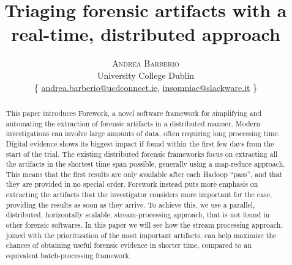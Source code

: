 \documentclass[twoside]{article}
\title{\vspace{-15mm}\fontsize{24pt}{10pt}\selectfont\textbf{Triaging forensic
    artifacts with a real-time, distributed approach}}
\author{\large
\textsc{Andrea Barberio}\\[2mm] %
\normalsize University College Dublin \\ %
\normalsize
    \{
        \href{mailto:andrea.barberio@ucdconnect.ie}{andrea.barberio@ucdconnect.ie},
        \href{mailto:insomniac@slackware.it}{insomniac@slackware.it}
    \}
\vspace{-5mm}
}
\date{}
\begin{document}
\maketitle %

\thispagestyle{fancy} %


\begin{abstract}

\noindent
    This paper introduces Forework, a novel software framework for
    simplifying and automating the extraction of forensic artifacts in a
    distributed manner.
    Modern investigations can involve large amounts of data, often requiring
    long processing time.
    Digital evidence shows its biggest impact if found within the first few
    days from the start of the trial.
    The existing distributed forensic frameworks focus on extracting all the artifacts
    in the shortest time span possible, generally using a map-reduce approach.
    This means that the first results are only available after each Hadoop
    ``pass'', and that they are provided in no special order.
    Forework instead puts more emphasis on extracting the artifacts that the
    investigator considers more important for the case, providing the results
    as soon as they arrive.
    To achieve this, we use a parallel, distributed, horizontally
    scalable, stream-processing approach, that is not found in other forensic
    softwares.
    In this paper we will see how the stream processing approach, joined with
    the prioritization of the most important artifacts, can help maximize the
    chances of obtaining useful forensic evidence in shorter time, compared to
    an equivalent batch-processing framework.

\end{abstract}

\end{document}
